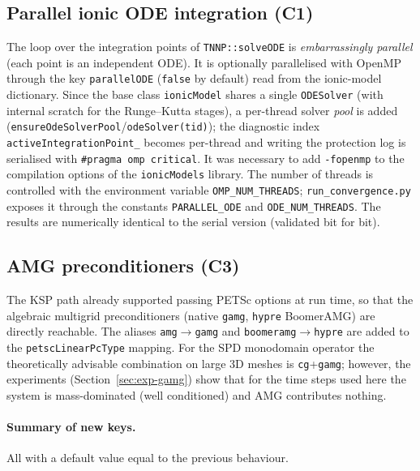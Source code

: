 \documentclass[11pt,a4paper]{article}
\newcommand{\code}[1]{\texttt{\small #1}}
\newcommand{\pyconst}[1]{\textcolor{black!60!blue}{\texttt{\footnotesize #1}}}
\newcommand{\dictkey}[1]{\textcolor{black!60!green}{\texttt{\footnotesize #1}}}
\begin{document}
\subsection{Parallel ionic ODE integration (C1)}
\label{sec:optim-C1}

The loop over the integration points of \code{TNNP::solveODE} is
\emph{embarrassingly parallel} (each point is an independent ODE). It is optionally
parallelised with OpenMP through the key \dictkey{parallelODE} (\code{false} by
default) read from the ionic-model dictionary. Since the base class
\code{ionicModel} shares a single \code{ODESolver} (with internal scratch for the
Runge--Kutta stages), a per-thread solver \emph{pool} is added
(\code{ensureOdeSolverPool}/\code{odeSolver(tid)}); the diagnostic index
\code{activeIntegrationPoint\_} becomes per-thread and writing the protection
log is serialised with \code{\#pragma omp critical}. It was necessary to add
\code{-fopenmp} to the compilation options of the \code{ionicModels} library.
The number of threads is controlled with the environment variable \code{OMP\_NUM\_THREADS};
\code{run\_convergence.py} exposes it through the constants \pyconst{PARALLEL\_ODE}
and \pyconst{ODE\_NUM\_THREADS}. The results are numerically identical to the
serial version (validated bit for bit).

\subsection{AMG preconditioners (C3)}
\label{sec:optim-C3}

The KSP path already supported passing PETSc options at run time, so
that the algebraic multigrid preconditioners (native \code{gamg}, \code{hypre}
BoomerAMG) are directly reachable. The aliases
\code{amg}$\to$\code{gamg} and \code{boomeramg}$\to$\code{hypre} are added to the
\dictkey{petscLinearPcType} mapping. For the SPD monodomain operator the
theoretically advisable combination on large 3D meshes is \code{cg}+\code{gamg}; however,
the experiments (Section~\ref{sec:exp-gamg}) show that for the time steps
used here the system is mass-dominated (well conditioned) and
AMG contributes nothing.

\paragraph{Summary of new keys.}
All with a default value equal to the previous behaviour.
\end{document}

